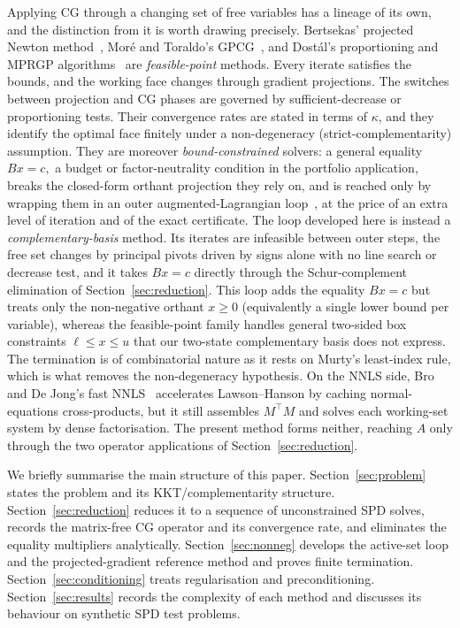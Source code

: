 Applying CG through a changing set of free variables has a lineage of its own, and the distinction from it is worth drawing precisely. Bertsekas' projected Newton
method~\cite{bertsekas1982}, Mor\'e and Toraldo's GPCG~\cite{moretoraldo1991}, and Dost\'al's
proportioning and MPRGP algorithms~\cite{dostal1997,dostalschoberl2005} are
\emph{feasible-point} methods. Every iterate satisfies the bounds, and the working face
changes through gradient projections. The switches between projection and CG phases are
governed by sufficient-decrease or proportioning tests. Their convergence rates are stated in
terms of $\kappa$, and they identify the optimal face finitely under a non-degeneracy
(strict-complementarity) assumption. They are moreover \emph{bound-constrained} solvers: a
general equality $Bx = c,$ a budget or factor-neutrality condition in the portfolio
application, breaks the closed-form orthant projection they rely on, and is reached only by
wrapping them in an outer augmented-Lagrangian loop~\cite{dostal2006smalbe}, at the price of an
extra level of iteration and of the exact certificate. The loop developed here is instead a
\emph{complementary-basis} method. Its iterates are infeasible between outer steps, the free
set changes by principal pivots driven by signs alone with no line search or decrease test, and
it takes $Bx = c$ directly through the Schur-complement elimination of
Section~\ref{sec:reduction}. This loop adds the equality $Bx = c$ but
treats only the non-negative orthant $x \geq 0$ (equivalently a single lower bound per variable), whereas the feasible-point family handles general two-sided box constraints
$\ell \leq x \leq u$ that our two-state complementary basis does not express. The termination is of combinatorial nature as it rests on Murty's least-index rule, which is what removes the non-degeneracy hypothesis. On the NNLS side, Bro and De Jong's fast NNLS~\cite{brodejong1997} accelerates Lawson--Hanson by caching normal-equations cross-products, but it still assembles $M^\top M$ and solves each working-set system by dense factorisation. The present method forms neither, reaching $A$ only through the two operator
applications of Section~\ref{sec:reduction}.

We briefly summarise the main structure of this paper. Section~\ref{sec:problem} states the problem and its KKT/complementarity structure.
Section~\ref{sec:reduction} reduces it to a sequence of unconstrained SPD solves, records the
matrix-free CG operator and its convergence rate, and eliminates the equality multipliers
analytically. Section~\ref{sec:nonneg} develops the active-set loop and the projected-gradient
reference method and proves finite termination. Section~\ref{sec:conditioning} treats
regularisation and preconditioning. Section~\ref{sec:results} records the complexity of each
method and discusses its behaviour on synthetic SPD test problems.

